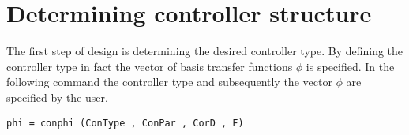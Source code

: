 \documentclass [12pt , a4paper] {report}
\begin{document}
\section{Determining controller structure}
The first step of design is determining the desired controller type. By defining the controller type in fact the vector of basis transfer functions $\phi$ is specified. In the following command the controller type and subsequently the vector $\phi$ are specified by the user.
\begin{lstlisting}
phi = conphi (ConType , ConPar , CorD , F) 
\end{lstlisting}
\end{document}
